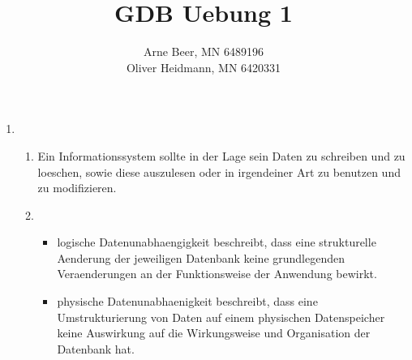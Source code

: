 \documentclass{article}
\title{GDB Uebung 1}
\author{Arne Beer, MN 6489196\\
        Oliver Heidmann, MN 6420331}
\begin{document}
\maketitle
    \begin{enumerate}
        \item
            \begin{enumerate}
                \item Ein Informationssystem sollte in der Lage sein Daten zu schreiben und zu loeschen, sowie diese auszulesen oder in irgendeiner Art zu benutzen und zu modifizieren. 

                \item 
                    \begin{itemize}
                        \item logische Datenunabhaengigkeit beschreibt, dass eine strukturelle Aenderung der jeweiligen Datenbank keine grundlegenden Veraenderungen an der Funktionsweise der Anwendung  bewirkt.
                        \item physische Datenunabhaenigkeit beschreibt, dass eine Umstrukturierung von Daten auf einem physischen Datenspeicher keine Auswirkung auf die Wirkungsweise und Organisation der Datenbank hat. 
                    \end{itemize}


\end{enumerate}
\end{enumerate}
\end{document}
